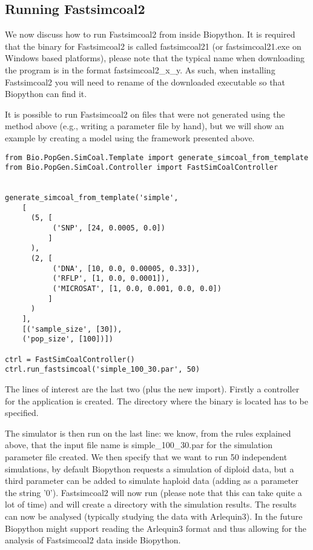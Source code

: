 \documentclass{report}
\begin{document}
\subsection{Running Fastsimcoal2}

We now discuss how to run Fastsimcoal2 from inside Biopython. It is required
that the binary for Fastsimcoal2 is called fastsimcoal21 (or fastsimcoal21.exe on Windows
based platforms), please note that the typical name when downloading the
program is in the format fastsimcoal2\_x\_y. As such, when installing
Fastsimcoal2
you will need to rename of the downloaded executable so that Biopython can
find it.

It is possible to run Fastsimcoal2 on files that were not generated using the method
above (e.g., writing a parameter file by hand), but we will show an
example by creating a model using the framework presented above.

\begin{verbatim}
from Bio.PopGen.SimCoal.Template import generate_simcoal_from_template
from Bio.PopGen.SimCoal.Controller import FastSimCoalController


generate_simcoal_from_template('simple',
    [
      (5, [
           ('SNP', [24, 0.0005, 0.0])
          ]
      ),
      (2, [
           ('DNA', [10, 0.0, 0.00005, 0.33]),
           ('RFLP', [1, 0.0, 0.0001]),
           ('MICROSAT', [1, 0.0, 0.001, 0.0, 0.0])
          ]
      )
    ],
    [('sample_size', [30]),
    ('pop_size', [100])])

ctrl = FastSimCoalController()
ctrl.run_fastsimcoal('simple_100_30.par', 50)
\end{verbatim}

The lines of interest are the last two (plus the new import).
Firstly a controller for the
application is created. The directory where the binary is located has
to be specified.

The simulator is then run on the last line: we know, from the rules explained
above, that the input file name is simple\_100\_30.par for the
simulation parameter file created. We then specify
that we want to run 50 independent simulations, by default Biopython
requests a simulation of diploid data, but a third parameter can
be added to simulate haploid data (adding as a parameter the
string '0'). Fastsimcoal2 will now run (please
note that this can take quite a lot of time) and will create a directory
with the simulation results. The results can now be analysed (typically
studying the data with Arlequin3). In the future Biopython might support
reading the Arlequin3 format and thus allowing for the analysis of
Fastsimcoal2
data inside Biopython.
\end{document}
